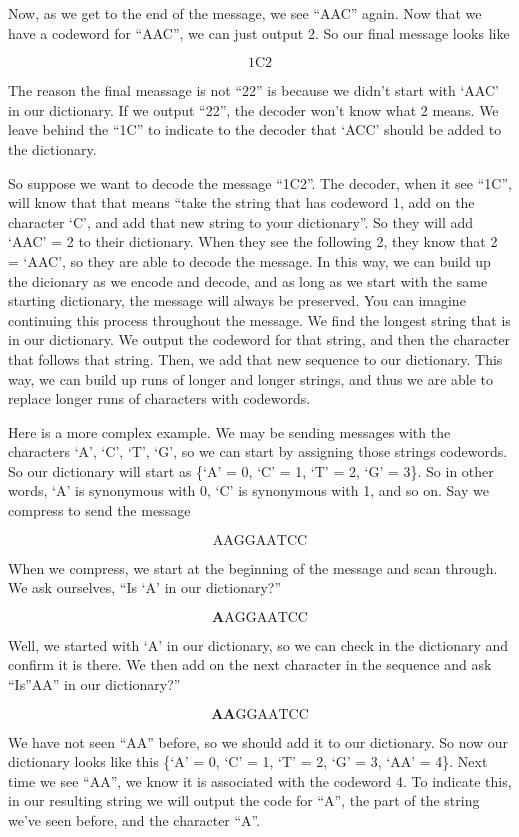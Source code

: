 \documentclass[12pt,twoside]{reedthesis}
\begin{document}
Now, as we get to the end of the message, we see ``AAC'' again. Now that we have a codeword for ``AAC'', we can just output 2. So our final message looks like

\[\text{1C2}\]

The reason the final meassage is not ``22'' is because we didn't start with `AAC' in our dictionary. If we output ``22'', the decoder won't know what 2 means. We leave behind the ``1C'' to indicate to the decoder that `ACC' should be added to the dictionary.

So suppose we want to decode the message ``1C2''. The decoder, when it see ``1C'', will know that that means ``take the string that has codeword 1, add on the character `C', and add that new string to your dictionary''. So they will add `AAC' = 2 to their dictionary. When they see the following 2, they know that 2 = `AAC', so they are able to decode the message. In this way, we can build up the dicionary as we encode and decode, and as long as we start with the same starting dictionary, the message will always be preserved. You can imagine continuing this process throughout the message. We find the longest string that is in our dictionary. We output the codeword for that string, and then the character that follows that string. Then, we add that new sequence to our dictionary. This way, we can build up runs of longer and longer strings, and thus we are able to replace longer runs of characters with codewords.

Here is a more complex example. We may be sending messages with the characters `A', `C', `T', `G', so we can start by assigning those strings codewords. So our dictionary will start as \{`A' = 0, `C' = 1, `T' = 2, `G' = 3\}. So in other words, `A' is synonymous with 0, `C' is synonymous with 1, and so on. Say we compress to send the message

\[\text{AAGGAATCC}\]

When we compress, we start at the beginning of the message and scan through. We ask ourselves, ``Is `A' in our dictionary?''

\[\textbf{A} \text{AGGAATCC}\]

Well, we started with `A' in our dictionary, so we can check in the dictionary and confirm it is there. We then add on the next character in the sequence and ask ``Is''AA'' in our dictionary?''

\[\textbf{AA} \text{GGAATCC}\]

We have not seen ``AA'' before, so we should add it to our dictionary. So now our dictionary looks like this \{`A' = 0, `C' = 1, `T' = 2, `G' = 3, `AA' = 4\}. Next time we see ``AA'', we know it is associated with the codeword 4. To indicate this, in our resulting string we will output the code for ``A'', the part of the string we've seen before, and the character ``A''.
\end{document}
